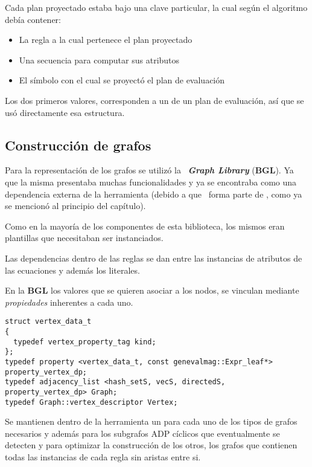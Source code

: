 Cada plan proyectado estaba bajo una clave particular, la cual según el algoritmo debía contener:
\begin{itemize}
\item La regla a la cual pertenece el plan proyectado
\item Una secuencia para computar sus atributos
\item El símbolo con el cual se proyectó el plan de evaluación
\end{itemize}

Los dos primeros valores, corresponden a un  de un plan de evaluación, así que se usó directamente esa estructura.

\subsection{Construcción de grafos}
\label{subsec:const-graf}
Para la representación de los grafos se utilizó la \boost\ \textit{\textbf{Graph Library}} (\textbf{BGL}). Ya que la misma presentaba muchas funcionalidades y ya se encontraba como una dependencia externa de la herramienta (debido a que \spirit\ forma parte de \boost, como ya se mencionó al principio del capítulo).

Como en la mayoría de los componentes de esta biblioteca, los mismos eran plantillas que necesitaban ser instanciados.

Las dependencias dentro de las reglas se dan entre las instancias de atributos de las ecuaciones y además los literales.

En la \textbf{BGL} los valores que se quieren asociar a los nodos, se vinculan mediante \textit{propiedades} inherentes a cada uno.

\begin{lstlisting}[columns=fullflexible, basicstyle=\scriptsize, linewidth=13.5cm]
struct vertex_data_t
{
  typedef vertex_property_tag kind;
};
typedef property <vertex_data_t, const genevalmag::Expr_leaf*> property_vertex_dp;
typedef adjacency_list <hash_setS, vecS, directedS, property_vertex_dp> Graph;
typedef Graph::vertex_descriptor Vertex;
\end{lstlisting}

Se mantienen dentro de la herramienta un  para cada uno de los tipos de grafos necesarios y además para los subgrafos ADP cíclicos que eventualmente se detecten y para optimizar la construcción de los otros, los grafos que contienen todas las instancias de cada regla sin aristas entre si.

